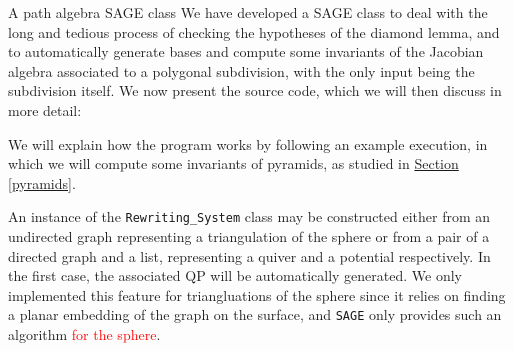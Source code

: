 \begin{chapter}{A path algebra SAGE class}
\label{appendix}
We have developed a SAGE class to deal with the long and tedious process of checking the hypotheses of the diamond lemma, and to automatically generate bases and compute some invariants of the Jacobian algebra associated to a polygonal subdivision, with the only input being the subdivision itself. We now present the source code, which we will then discuss in more detail:

We will explain how the program works by following an example execution, in which we will compute some invariants of pyramids, as studied in \hyperref[pyramids]{Section \ref*{pyramids}}.

An instance of the \texttt{Rewriting\_System} class may be constructed either from an undirected graph representing a triangulation of the sphere or from a pair of a directed graph and a list, representing a quiver and a potential respectively. In the first case, the associated QP will be automatically generated. We only implemented this feature for triangluations of the sphere since it relies on finding a planar embedding of the graph on the surface, and \texttt{SAGE} only provides such an algorithm \textcolor{red}{for the sphere}.


\end{chapter}
